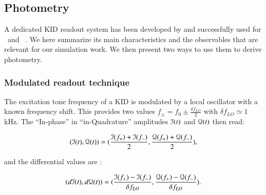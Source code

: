 
\subsection{Photometry}
\label{sec:signal}

A dedicated KID readout system has been developed by
\citet{2013A&A...551L..12C} and successfully used for \nika\ and
\ . We here summarize its
main characteristics and the observables that are
relevant for our simulation work. We then present two ways to use them to derive photometry.


\subsubsection{Modulated readout technique}
The excitation tone frequency of a KID is modulated by a local oscillator with a
known frequency shift. This provides two values $f_{\pm} = f_0 \pm \frac{\delta
  f_{LO}}{2}$ with $\delta f_{LO} \simeq 1$\,kHz. The ``In-phase'' in
``in-Quadrature'' amplitudes $\mathcal{I}(t)$ and $\mathcal{Q}(t)$ then read:

\begin{equation}
(\mathcal{I}(t), \mathcal{Q}(t)) = (\frac{\mathcal{I}(f_{+}) +
    \mathcal{I}(f_{-})}{2},
\frac{\mathcal{Q}(f_{+}) + \mathcal{Q}(f_{-})}{2}),
\end{equation}

and the differential values are :

\begin{equation}
\label{gradient}
(d\mathcal{I}(t), d\mathcal{Q}(t)) =
(\frac{\mathcal{I}(f_{+}) - \mathcal{I}(f_{-})}{\delta f_{LO}},
\frac{\mathcal{Q}(f_{+}) - \mathcal{Q}(f_{-})}{\delta f_{LO}}).
\end{equation}

